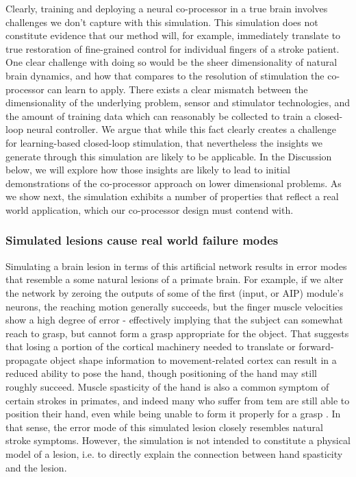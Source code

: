 \documentclass[12pt]{iopart}
\begin{document}
Clearly, training and deploying a neural co-processor in a true brain involves challenges we
don't capture with this simulation. This simulation does not constitute evidence
that our method will, for example, immediately translate to true restoration of fine-grained
control for individual fingers of a stroke patient. One clear challenge with doing so would
be the sheer dimensionality of natural brain dynamics, and how that compares to the resolution
of stimulation the co-processor can learn to apply. There exists a clear mismatch between
the dimensionality of the underlying problem, sensor and stimulator technologies, and the
amount of training data which can reasonably be collected to train a closed-loop neural
controller. We argue that while this fact clearly creates a challenge for learning-based
closed-loop stimulation, that nevertheless the insights we generate through this
simulation are likely to be applicable. In the Discussion below, we will explore how
those insights are likely to lead to initial demonstrations of the co-processor approach
on lower dimensional problems. As we show next, the simulation exhibits a number of
properties that reflect a real world application, which our co-processor design must
contend with.

\subsubsection{Simulated lesions cause real world failure modes}
Simulating a brain lesion in terms of this artificial network results in error
modes that resemble a some natural lesions of a primate brain. For example, if we
alter the network by zeroing the outputs of some of the first (input, or AIP) module's neurons,
the reaching motion generally succeeds, but the finger muscle velocities show a high degree
of error - effectively implying that the subject can somewhat reach to grasp, but cannot form a
grasp appropriate for the object. That suggests that losing a portion of the cortical
machinery needed to translate or forward-propagate object shape information
to movement-related cortex can result in a reduced ability to pose the hand, though
positioning of the hand may still roughly succeed. Muscle spasticity of
the hand is also a common symptom of certain strokes in primates, and indeed many who
suffer from tem are still able to position their hand, even while being unable to form
it properly for a grasp \cite{khanna.openloop}. In that sense, the error mode of this
simulated lesion closely resembles natural stroke symptoms. However, the simulation is
not intended to constitute a physical model of a lesion, i.e. to directly explain the
connection between hand spasticity and the lesion.
\end{document}
